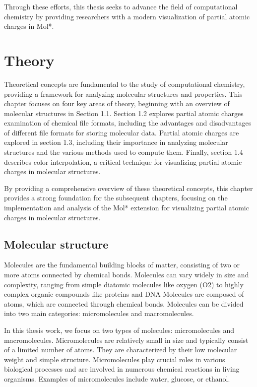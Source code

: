 \documentclass[
  digital,     %
  oneside,     %
  nosansbold,  %
  nocolorbold, %
  lof,         %
  lot,         %
]{fithesis4}
\begin{document}
Through these efforts, this thesis seeks to advance the field of computational chemistry by providing researchers with a modern visualization of partial atomic charges in Mol*.

\newpage
\chapter{Theory}
\label{chapter:theory}

Theoretical concepts are fundamental to the study of computational chemistry, providing a framework for analyzing molecular structures and properties. This chapter focuses on four key areas of theory, beginning with an overview of molecular structures in Section 1.1. Section 1.2 explores partial atomic charges
examination of chemical file formats, including the advantages and disadvantages of different file formats for storing molecular data. Partial atomic charges are explored in section 1.3, including their importance in analyzing molecular structures and the various methods used to compute them. Finally, section 1.4 describes color interpolation, a critical technique for visualizing partial atomic charges in molecular structures.

By providing a comprehensive overview of these theoretical concepts, this chapter provides a strong foundation for the subsequent chapters, focusing on the implementation and analysis of the Mol* extension for visualizing partial atomic charges in molecular structures.

\section{Molecular structure}
\label{section:molecular_structure}

Molecules are the fundamental building blocks of matter, consisting of two or more atoms connected by chemical bonds. Molecules can vary widely in size and complexity, ranging from simple diatomic molecules like oxygen (O2) to highly complex organic compounds like proteins and DNA
Molecules are composed of atoms, which are connected through chemical bonds. Molecules can be divided into two main categories: micromolecules and macromolecules.

In this thesis work, we focus on two types of molecules: micromolecules and macromolecules. Micromolecules are relatively small in size and typically consist of a limited number of atoms. They are characterized by their low molecular weight and simple structure. Micromolecules play crucial roles in various biological processes and are involved in numerous chemical reactions in living organisms. Examples of micromolecules include water, glucose, or ethanol.
\end{document}
